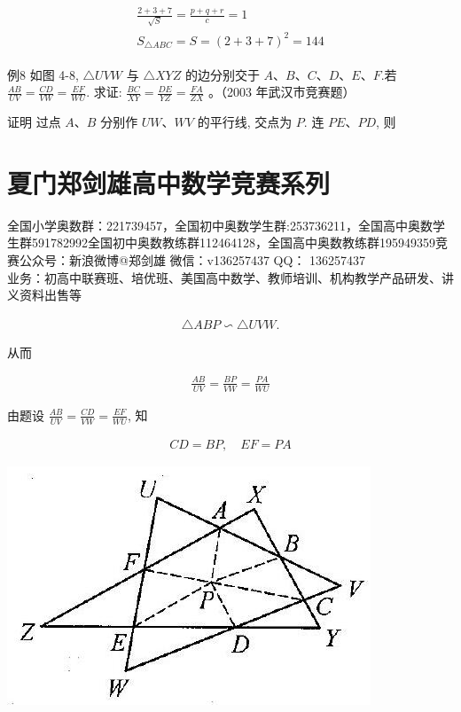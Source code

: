 \documentclass[10pt]{article}
\begin{document}
\begin{align*}
\begin{gathered}
\frac{2+3+7}{\sqrt{S}}=\frac{p+q+r}{c}=1 \\
S_{\triangle A B C}=S=(2+3+7)^{2}=144
\end{gathered}
\end{align*}

例8 如图 4-8, $\triangle U V W$ 与 $\triangle X Y Z$ 的边分别交于 $A 、 B 、 C 、 D 、 E 、 F$.若 $\frac{A B}{U V}=\frac{C D}{V W}=\frac{E F}{W U}$. 求证: $\frac{B C}{X Y}=\frac{D E}{Y Z}=\frac{F A}{Z X}$ 。（2003 年武汉市竞赛题）

证明 过点 $A 、 B$ 分别作 $U W 、 W V$ 的平行线, 交点为 $P$. 连 $P E 、 P D$, 则

\section*{夏门郑剑雄高中数学竞赛系列}
全国小学奥数群：221739457，全国初中奥数学生群:253736211，全国高中奥数学生群591782992全国初中奥数教练群112464128，全国高中奥数教练群195949359竞赛公众号：新浪微博@郑剑雄 微信：v136257437 QQ： 136257437\\
业务：初高中联赛班、培优班、美国高中数学、教师培训、机构教学产品研发、讲义资料出售等

\begin{align*}
\triangle A B P \backsim \triangle U V W .
\end{align*}

从而

\begin{align*}
\frac{A B}{U V}=\frac{B P}{V W}=\frac{P A}{W U}
\end{align*}

由题设 $\frac{A B}{U V}=\frac{C D}{V W}=\frac{E F}{W U}$, 知

\begin{align*}
C D=B P, \quad E F=P A
\end{align*}

\begin{center}
\includegraphics[max width=\textwidth]{2024_10_30_2c8f45efd4a519b08e1ag-041(1)}
\end{center}
\end{document}
